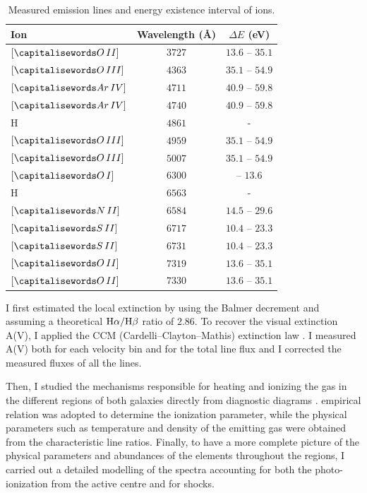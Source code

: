 \documentclass[../main.tex]{subfiles}
\begin{document}
\begin{table}
\caption[]{Measured emission lines and energy existence interval of ions.}
\label{tab:ion}
\centering
\begin{tabular}{lcc}
\hline
Ion&Wavelength (\AA)&$\Delta E$ (eV)\\
\hline
$[\ion{O}{II}]$& $3727$&$13.6$ -- $35.1$\\
$[\ion{O}{III}]$& $4363$&$35.1$ -- $54.9$\\
$[\ion{Ar}{IV}]$& $4711$&$40.9$ -- $59.8$\\
$[\ion{Ar}{IV}]$&$4740$&$40.9$ -- $59.8$\\
H& $4861$&-\\
$[\ion{O}{III}]$& $4959$&$35.1$ -- $54.9$\\
$[\ion{O}{III}]$& $5007$&$35.1$ -- $54.9$\\
$[\ion{O}{I}]$& $6300$&-- $13.6$\\
H&$6563$&-\\
$[\ion{N}{II}]$& $6584$&$14.5$ -- $29.6$\\
$[\ion{S}{II}]$& $6717$&$10.4$ -- $23.3$\\
$[\ion{S}{II}]$&$6731$&$10.4$ -- $23.3$\\
$[\ion{O}{II}]$& $7319$&$13.6$ -- $35.1$\\
$[\ion{O}{II}]$&  $7330$&$13.6$ -- $35.1$\\
\hline
\end{tabular}
\end{table}

I first estimated the local extinction by using the Balmer decrement and assuming a theoretical $\rm H\alpha/\rm H\beta$ ratio of $2.86$.
To recover the visual extinction A(V), I applied the CCM (Cardelli--Clayton--Mathis) extinction law \citep{Cardelli89}.
I measured A(V) both for each velocity bin and for the total line flux and I corrected the measured fluxes of all the lines.

Then, I studied the mechanisms responsible for heating and ionizing the gas in the different regions of both galaxies  directly from diagnostic diagrams \citep{Baldwin81,Veilleux87}. 
\citet{Penston90} empirical relation was adopted to determine the ionization parameter, while the physical parameters such as temperature and density of the emitting gas were obtained from the characteristic line ratios.
Finally, to have a more complete picture of the physical parameters and abundances of the elements throughout the regions, I carried out a detailed modelling of the spectra accounting for both the photo-ionization from the active centre and for shocks.
\end{document}
